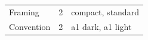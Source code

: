 \begin{table}[htbp]
\begin{tabular}{>{\raggedright\arraybackslash}p{.16\linewidth}r>{\raggedright\arraybackslash}p{.65\linewidth}}
Framing & %
2 & %
compact, standard \\ %

Convention & %
2 & %
a1 dark, a1 light \\ %

\bottomrule
\end{tabular}
\end{table}
\endgroup
